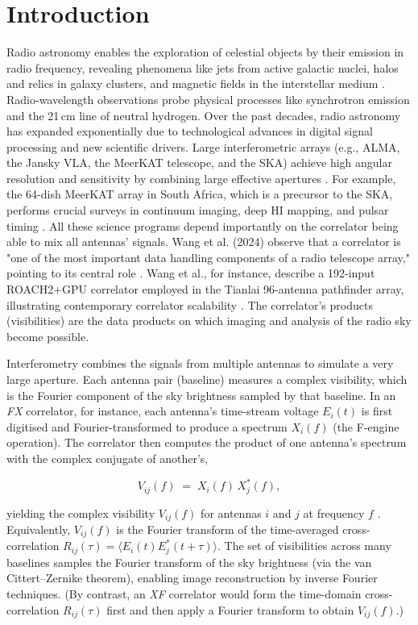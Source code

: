 \chapter{Introduction}
Radio astronomy enables the exploration of celestial objects by their emission in radio frequency, revealing phenomena like jets from active galactic nuclei, halos and relics in galaxy clusters, and magnetic fields in the interstellar medium \cite{Chibueze2023}. Radio-wavelength observations probe physical processes like synchrotron emission and the 21\,cm line of neutral hydrogen. Over the past decades, radio astronomy has expanded exponentially due to technological advances in digital signal processing and new scientific drivers. Large interferometric arrays (e.g., ALMA, the Jansky VLA, the MeerKAT telescope, and the SKA) achieve high angular resolution and sensitivity by combining large effective apertures \cite{Chibueze2023}. For example, the 64-dish MeerKAT array in South Africa, which is a precursor to the SKA, performs crucial surveys in continuum imaging, deep HI mapping, and pulsar timing \cite{Jonas2018}. All these science programs depend importantly on the correlator being able to mix all antennas' signals. Wang et al. (2024) observe that a correlator is "one of the most important data handling components of a radio telescope array," pointing to its central role \cite{Wang2024}. Wang et al., for instance, describe a 192-input ROACH2+GPU correlator employed in the Tianlai 96-antenna pathfinder array, illustrating contemporary correlator scalability \cite{Wang2024}. The correlator's products (visibilities) are the data products on which imaging and analysis of the radio sky become possible.

Interferometry combines the signals from multiple antennas to simulate a very large aperture. Each antenna pair (baseline) measures a complex visibility, which is the Fourier component of the sky brightness sampled by that baseline. In an \emph{FX} correlator, for instance, each antenna’s time-stream voltage $E_i(t)$ is first digitised and Fourier-transformed to produce a spectrum $X_i(f)$ (the F-engine operation). The correlator then computes the product of one antenna’s spectrum with the complex conjugate of another’s,

\[
  V_{ij}(f) \;=\; X_i(f)\,X_j^*(f),
\]

yielding the complex visibility $V_{ij}(f)$ for antennas $i$ and $j$ at frequency $f$ \cite{Wang2024}. Equivalently, $V_{ij}(f)$ is the Fourier transform of the time-averaged cross-correlation $R_{ij}(\tau)=\langle E_i(t)E_j^*(t+\tau)\rangle$. The set of visibilities across many baselines samples the Fourier transform of the sky brightness (via the van Cittert–Zernike theorem), enabling image reconstruction by inverse Fourier techniques. (By contrast, an \emph{XF} correlator would form the time-domain cross-correlation $R_{ij}(\tau)$ first and then apply a Fourier transform to obtain $V_{ij}(f)$.) 


